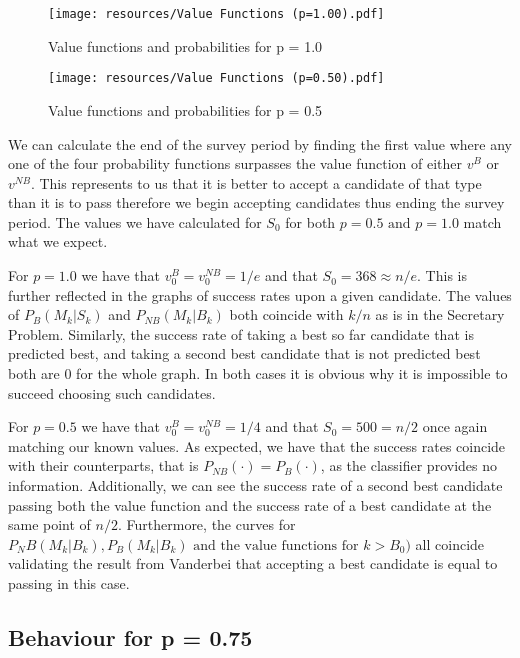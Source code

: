 \documentclass[a4paper,11pt]{article}
\begin{document}
\begin{figure}[H] 
    \centering 
    \texttt{[image: resources/Value Functions (p=1.00).pdf]}
    \caption{Value functions and probabilities for p = 1.0}
    \label{fig:value p=1.0} 
\end{figure}

\begin{figure}[H] 
    \centering
\texttt{[image: resources/Value Functions (p=0.50).pdf]}
    \caption{Value functions and probabilities for p = 0.5}
    \label{fig:value p = 0.5} 
\end{figure}



We can calculate the end of the survey period by finding the first value where any one of the four probability functions surpasses the value function of either $v^B$ or $v^{NB}$. This represents to us that it is better to accept a candidate of that type than it is to pass therefore we begin accepting candidates thus ending the survey period. The values we have calculated for $S_0$ for both $p=0.5 \text{ and } p = 1.0$ match what we expect.

For $p = 1.0$ we have that $v^B_0 = v^{NB}_0 = 1/e$ and that $S_0 = 368 \approx n/e$. This is further reflected in the graphs of success rates upon a given candidate. The values of $P_B(M_k|S_k)$ and $P_{NB}(M_k|B_k)$ both coincide with $k/n$ as is in the Secretary Problem. Similarly, the success rate of taking a best so far candidate that is predicted best, and taking a second best candidate that is not predicted best both are 0 for the whole graph. In both cases it is obvious why it is impossible to succeed choosing such candidates.

For $p = 0.5$ we have that $v^B_0 = v^{NB}_0 = 1/4$ and that $S_0 = 500 = n/2$ once again matching our known values. As expected, we have that the success rates coincide with their counterparts, that is $P_{NB}(\cdot) =P_B({\cdot})$, as the classifier provides no information. Additionally, we can see the success rate of a second best candidate passing both the value function and the success rate of a best candidate at the same point of $n/2$. Furthermore, the curves for $P_NB(M_k|B_k), P_B(M_k|B_k) \text{ and the value functions for } k > B_0)$ all coincide validating the result from Vanderbei \cite{vanderbei2011postdoc}  that accepting a best candidate is equal to passing in this case.
\subsection{Behaviour for p = 0.75}
\label{sec:graph}
\end{document}

